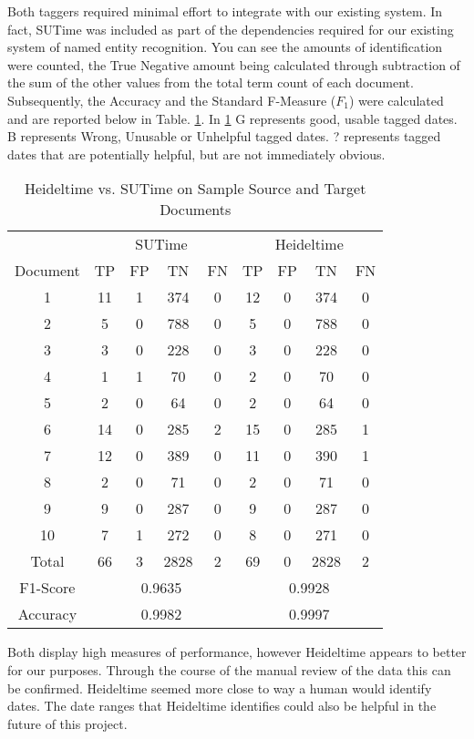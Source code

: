 \documentclass{mprop}
\begin{document}
Both taggers required minimal effort to integrate with our existing system. In fact, SUTime was included as part of the dependencies required for our existing system of named entity recognition. You can see the amounts of identification were counted, the True Negative amount being calculated through subtraction of the sum of the other values from the total term count of each document. Subsequently, the Accuracy and the Standard F-Measure (\textbf{$ F_1 $}) were calculated and are reported below in Table. \ref{temporalcomparison}.
In \ref{temporalcomparison} G represents good, usable tagged dates. B represents Wrong, Unusable or Unhelpful tagged dates. ? represents tagged dates that are potentially helpful, but are not immediately obvious.
\begin{table}[H]
\centering
\begin{tabular}{|c|c|c|c|c|c|c|c|c|}
\hline
& \multicolumn{4}{|c|}{SUTime}    & \multicolumn{4}{|c|}{Heideltime} \\ 
\cline{2-9}
Document & TP  & FP  & TN   & FN    & TP & FP & TN   & FN    \\ \hline
1        & 11  & 1   & 374  & 0	    & 12 & 0  & 374  & 0     \\ \hline
2        & 5   & 0	 & 788  & 0	    & 5  & 0  & 788  & 0     \\ \hline
3		 & 3   & 0   & 228  & 0		& 3  & 0  & 228  & 0	 \\ \hline
4        & 1   & 1	 & 70   & 0		& 2  & 0  & 70   & 0	 \\ \hline
5	     & 2   & 0	 & 64   & 0		& 2	 & 0  & 64   & 0     \\ \hline
6		 & 14  & 0	 & 285  & 2		& 15 & 0  & 285  & 1     \\ \hline
7		 & 12  & 0	 & 389  & 0		& 11 & 0  & 390  & 1	 \\ \hline
8		 & 2   & 0	 & 71   & 0	  	& 2	 & 0  & 71   & 0	 \\ \hline
9		 & 9   & 0	 & 287  & 0		& 9	 & 0  & 287  & 0	 \\ \hline
10		 & 7   & 1	 & 272  & 0		& 8	 & 0  & 271  & 0	 \\ \hline
Total    & 66  & 3	 & 2828 & 2	  	& 69 & 0  &	2828 & 2     \\ \hline
F1-Score & \multicolumn{4}{|c|}{0.9635} & \multicolumn{4}{|c|}{0.9928} \\ \hline
Accuracy & \multicolumn{4}{|c|}{0.9982} & \multicolumn{4}{|c|}{0.9997} \\ \hline
\end{tabular}
\caption{Heideltime vs. SUTime on Sample Source and Target Documents}
\label{temporalcomparison}
\end{table}
Both display high measures of performance, however Heideltime appears to better for our purposes. Through the course of the manual review of the data this can be confirmed. Heideltime seemed more close to way a human would identify dates. The date ranges that Heideltime identifies could also be helpful in the future of this project.
\end{document}
